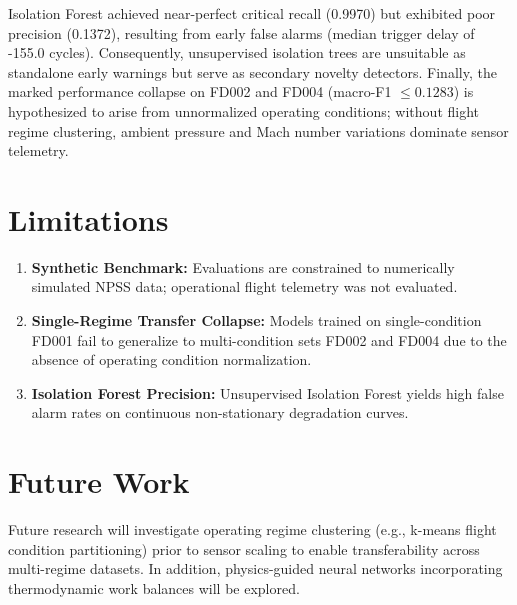\documentclass[conference]{IEEEtran}
\begin{document}
Isolation Forest achieved near-perfect critical recall (0.9970) but exhibited poor precision (0.1372), resulting from early false alarms (median trigger delay of -155.0 cycles). Consequently, unsupervised isolation trees are unsuitable as standalone early warnings but serve as secondary novelty detectors. Finally, the marked performance collapse on FD002 and FD004 (macro-F1 $\le 0.1283$) is hypothesized to arise from unnormalized operating conditions; without flight regime clustering, ambient pressure and Mach number variations dominate sensor telemetry.

\section{Limitations}
\begin{enumerate}
    \item \textbf{Synthetic Benchmark:} Evaluations are constrained to numerically simulated NPSS data; operational flight telemetry was not evaluated.
    \item \textbf{Single-Regime Transfer Collapse:} Models trained on single-condition FD001 fail to generalize to multi-condition sets FD002 and FD004 due to the absence of operating condition normalization.
    \item \textbf{Isolation Forest Precision:} Unsupervised Isolation Forest yields high false alarm rates on continuous non-stationary degradation curves.
\end{enumerate}

\section{Future Work}
Future research will investigate operating regime clustering (e.g., k-means flight condition partitioning) prior to sensor scaling to enable transferability across multi-regime datasets. In addition, physics-guided neural networks incorporating thermodynamic work balances will be explored.

\balance


\end{document}
